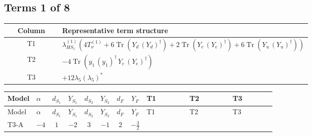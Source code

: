 \documentclass[8pt]{article}
\begin{document}
\begin{landscape}
\subsection*{Terms 1 of 8}
\begin{center}
\begin{tabular}{@{}c >{\raggedright\arraybackslash}p{0.82\linewidth}@{}}
\toprule
Column & Representative term structure \\
\midrule
T1 & \(\displaystyle {\lambda_{HS_1}^{(1)}} (4 T_{\nu}^{(1)}+6 \operatorname{Tr}\!\left({Y_d}\,\left({Y_d}\right)^{\dagger}\right)+2 \operatorname{Tr}\!\left({Y_e}\,\left({Y_e}\right)^{\dagger}\right)+6 \operatorname{Tr}\!\left({Y_u}\,\left({Y_u}\right)^{\dagger}\right))\) \\
\midrule
T2 & \(\displaystyle -4 \operatorname{Tr}\!\left({y_1}\,\left({y_1}\right)^{\dagger}\,{Y_e}\,\left({Y_e}\right)^{\dagger}\right)\) \\
\midrule
T3 & \(\displaystyle +12 {\lambda_5} \left({\lambda_5}\right)^{*}\) \\
\midrule
\bottomrule
\end{tabular}
\end{center}
\smallskip
\tiny
\begin{longtable}{@{}llcccccc >{\raggedright\arraybackslash}p{0.21\linewidth} >{\raggedright\arraybackslash}p{0.21\linewidth} >{\raggedright\arraybackslash}p{0.21\linewidth}@{}}
\toprule
Model & $\alpha$ & $d_{S_1}$ & $Y_{S_1}$ & $d_{S_2}$ & $Y_{S_2}$ & $d_F$ & $Y_F$ & T1 & T2 & T3 \\
\midrule
\endfirsthead
\toprule
Model & $\alpha$ & $d_{S_1}$ & $Y_{S_1}$ & $d_{S_2}$ & $Y_{S_2}$ & $d_F$ & $Y_F$ & T1 & T2 & T3 \\
\midrule
\endhead
T3-A & $-4$ & $1$ & $-2$ & $3$ & $-1$ & $2$ & $-\frac{3}{2}$ & \scriptsize\adjustbox{max width=\linewidth}{$\begin{gathered} {\lambda_{HS_1}^{(1)}} (4 T_{\nu}^{(1)}+6 \operatorname{Tr}\!\left({Y_d}\,\left({Y_d}\right)^{\dagger}\right)+2 \operatorname{Tr}\!\left({Y_e}\,\left({Y_e}\right)^{\dagger}\right)+6 \operatorname{Tr}\!\left({Y_u}\,\left({Y_u}\right)^{\dagger}\right))\end{gathered}$} & \scriptsize\adjustbox{max width=\linewidth}{$\begin{gathered} -4 \operatorname{Tr}\!\left({y_1}\,\left({y_1}\right)^{\dagger}\,{Y_e}\,\left({Y_e}\right)^{\dagger}\right)\end{gathered}$} & \scriptsize\adjustbox{max width=\linewidth}{$\begin{gathered} +12 {\lambda_5} \left({\lambda_5}\right)^{*}\end{gathered}$} \\

\end{longtable}
\end{landscape}
\end{document}
